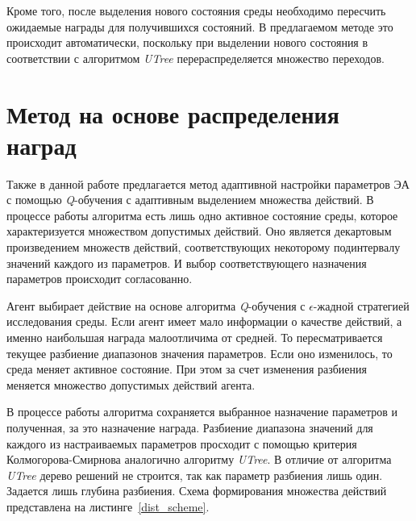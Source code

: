 Кроме того, после выделения нового состояния среды необходимо пересчить ожидаемые награды для получившихся состояний. В предлагаемом методе это происходит автоматически, поскольку при выделении нового состояния в соответствии с алгоритмом \textit{UTree} перераспределяется множество переходов.

\section{Метод на основе распределения наград}
\label{dist_method}

Также в данной работе предлагается метод адаптивной настройки параметров ЭА с помощью \textit{Q}-обучения с адаптивным выделением множества действий. В процессе работы алгоритма есть лишь одно активное состояние среды, которое характеризуется множеством допустимых действий. Оно является декартовым произведением множеств действий, соответствующих некоторому подинтервалу значений каждого из параметров. И выбор соответствующего назначения параметров происходит согласованно.

Агент выбирает действие на основе алгоритма \textit{Q}-обучения с $\epsilon$-жадной стратегией исследования среды. Если агент имеет мало информации о качестве действий, а именно наибольшая награда малоотличима от средней. То пересматривается текущее разбиение диапазонов значения параметров. Если оно изменилось, то среда меняет активное состояние. При этом за счет изменения разбиения меняется множество допустимых действий агента.

В процессе работы алгоритма сохраняется выбранное назначение параметров и полученная, за это назначение награда. Разбиение диапазона значений для каждого из настраиваемых параметров просходит с помощью критерия Колмогорова-Смирнова аналогично алгоритму \textit{UTree}. В отличие от алгоритма \textit{UTree} дерево решений не строится, так как параметр разбиения лишь один. Задается лишь глубина разбиения. Схема формирования множества действий представлена на листинге~\ref{dist_scheme}.


